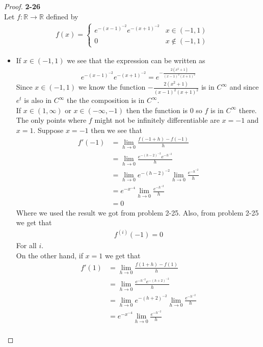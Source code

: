 \documentclass[11pt]{article}
\newcommand{\R}{\mathbb{R}}
\theoremstyle{definition}
\begin{document}
\cleardoublepage
\begin{proof}{\textbf{2-26}}\\
Let $f:\R \to \R$ defined by
\begin{align*}
    f(x) = \begin{cases}
        e^{-(x-1)^{-2}} e^{-(x+1)^{-2}} & x \in (-1,1)\\
        0 & x \not\in (-1, 1)
    \end{cases}
\end{align*}
\begin{itemize}
\item [(a)] If $x \in (-1,1)$ we see that the expression can be written as
\begin{align*}
    e^{-(x-1)^{-2}} e^{-(x+1)^{-2}} = e^{-\frac{2(x^2 + 1)}{(x-1)^2(x+1)^2}}
\end{align*}
Since $x \in (-1, 1)$ we know the function $-\frac{2(x^2 + 1)}{(x-1)^2(x+1)^2}$
is in $C^\infty$ and since $e^t$ is also in $C^\infty$ the the composition is
in $C^\infty$.
\\
If $x \in (1, \infty)$ or $x \in (-\infty, -1)$ then the function is 0 so $f$
is in $C^\infty$ there.
\\
The only points where $f$ might not be infinitely differentiable are $x = -1$
and $x = 1$.
Suppose $x = -1$ then we see that
\begin{align*}
    f'(-1) &= \lim_{h\to 0}\frac{f(-1+h) - f(-1)}{h}\\
    &= \lim_{h\to 0}\frac{e^{-(h-2)^{-2}} e^{-h^{-2}}}{h}\\
    &= \lim_{h\to 0}e^{-(h-2)^{-2}}\lim_{h\to 0}\frac{e^{-h^{-2}}}{h}\\
    &= e^{-x^{-4}}\lim_{h\to 0}\frac{e^{-h^{-2}}}{h}\\
    &= 0
\end{align*}
Where we used the result we got from problem 2-25. Also, from problem 2-25 we
get that
\begin{align*}
    f^{(i)}(-1) = 0    
\end{align*}
For all $i$.\\
On the other hand, if $x = 1$ we get that
\begin{align*}
    f'(1) &= \lim_{h\to 0}\frac{f(1+h) - f(1)}{h}\\
    &= \lim_{h\to 0}\frac{e^{-h^{-2}} e^{-(h+2)^{-2}}}{h}\\
    &= \lim_{h\to 0}e^{-(h+2)^{-2}}\lim_{h\to 0}\frac{e^{-h^{-2}}}{h}\\
    &= e^{-x^{-4}}\lim_{h\to 0}\frac{e^{-h^{-2}}}{h}\\

\end{align*}
\end{itemize}
\end{proof}
\end{document}
